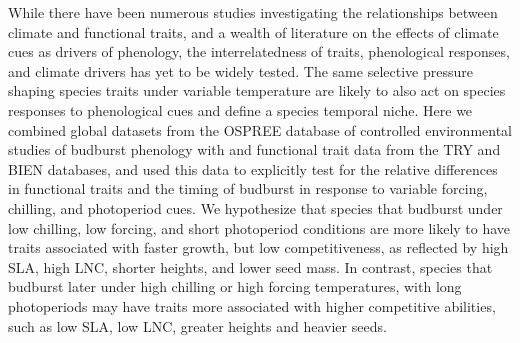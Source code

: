 \documentclass{article}\usepackage[]{graphicx}\usepackage[]{color}
\begin{document}
While there have been numerous studies investigating the relationships between climate and functional traits, and a wealth of literature on the effects of climate cues as drivers of phenology, the interrelatedness of traits, phenological responses, and climate drivers has yet to be widely tested. The same selective pressure shaping species traits under variable temperature are likely to also act on species responses to phenological cues and define a species temporal niche. Here we combined global datasets from the OSPREE database of controlled environmental studies of budburst phenology with and functional trait data from the TRY and BIEN databases, and used this data to explicitly test for the relative differences in functional traits and the timing of budburst in response to variable forcing, chilling, and photoperiod cues. We hypothesize that species that budburst under low chilling, low forcing, and short photoperiod conditions are more likely to have traits associated with faster growth, but low competitiveness, as reflected by high SLA, high LNC, shorter heights, and lower seed mass. In contrast, species that budburst later under high chilling or high forcing temperatures, with long photoperiods  may have traits more associated with higher competitive abilities, such as low SLA, low LNC, greater heights and heavier seeds. 

\pagebreak
% 

\end{document}
